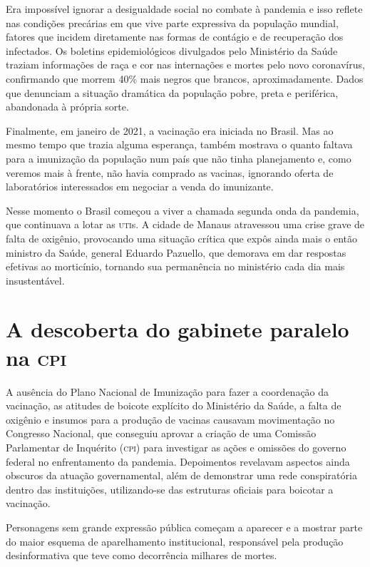 Era impossível ignorar a desigualdade social no combate à pandemia e
isso reflete nas condições precárias em que vive parte expressiva da
população mundial, fatores que incidem diretamente nas formas de
contágio e de recuperação dos infectados. Os boletins epidemiológicos
divulgados pelo Ministério da Saúde traziam informações de raça e cor
nas internações e mortes pelo novo coronavírus, confirmando que morrem
40\% mais negros que brancos, aproximadamente. Dados que denunciam a
situação dramática da população pobre, preta e periférica, abandonada à
própria sorte.

Finalmente, em janeiro de 2021, a vacinação era iniciada no Brasil. Mas
ao mesmo tempo que trazia alguma esperança, também mostrava o quanto
faltava para a imunização da população num país que não tinha
planejamento e, como veremos mais à frente, não havia comprado as
vacinas, ignorando oferta de laboratórios interessados em negociar a
venda do imunizante.

Nesse momento o Brasil começou a viver a chamada segunda onda da
pandemia, que continuava a lotar as \textsc{uti}s. A cidade de Manaus atravessou
uma crise grave de falta de oxigênio, provocando uma situação crítica
que expôs ainda mais o então ministro da Saúde, general Eduardo
Pazuello, que demorava em dar respostas efetivas ao morticínio, tornando
sua permanência no ministério cada dia mais insustentável.

\section{A descoberta do gabinete paralelo na \textsc{cpi}}

A ausência do Plano Nacional de Imunização para fazer a coordenação da
vacinação, as atitudes de boicote explícito do Ministério da Saúde, a
falta de oxigênio e insumos para a produção de vacinas causavam
movimentação no Congresso Nacional, que conseguiu aprovar a criação de
uma Comissão Parlamentar de Inquérito (\textsc{cpi}) para investigar as ações e
omissões do governo federal no enfrentamento da pandemia. Depoimentos
revelavam aspectos ainda obscuros da atuação governamental, além de
demonstrar uma rede conspiratória dentro das instituições, utilizando-se
das estruturas oficiais para boicotar a vacinação.

Personagens sem grande expressão pública começam a aparecer e a mostrar
parte do maior esquema de aparelhamento institucional, responsável pela
produção desinformativa que teve como decorrência milhares de mortes.


